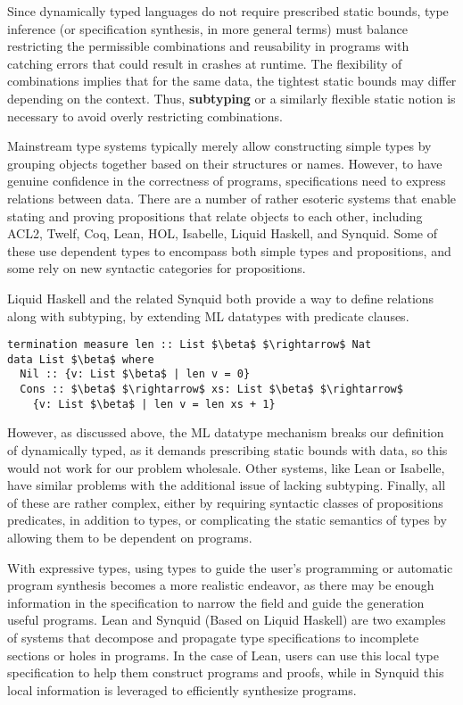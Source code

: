 \documentclass[sigplan,screen]{acmart}
\begin{document}
Since dynamically typed languages do not require prescribed static bounds, 
type inference (or specification synthesis, in more general terms) must balance 
restricting the permissible combinations and reusability in programs with 
catching errors that could result in crashes at runtime.
The flexibility of combinations implies that for the same data, 
the tightest static bounds may differ depending on the context.
Thus, \textbf{subtyping} or a similarly flexible 
static notion is necessary to avoid overly restricting combinations.

Mainstream type systems typically merely allow constructing simple types 
by grouping objects together based on their structures or names.
However, to have genuine confidence in the correctness of programs, specifications
need to express relations between data. There are a number of rather esoteric systems that
enable stating and proving propositions that relate objects to each other, 
including ACL2, Twelf, Coq, Lean, HOL, Isabelle, Liquid Haskell, and Synquid.  
Some of these use dependent types to encompass both simple types and propositions, 
and some rely on new syntactic categories for propositions. 

Liquid Haskell and the related Synquid both provide a way to define relations
along with subtyping, by extending ML datatypes with predicate clauses. 

\begin{lstlisting}[keywords={termination, measure, data, where}]
termination measure len :: List $\beta$ $\rightarrow$ Nat 
data List $\beta$ where
  Nil :: {v: List $\beta$ | len v = 0}
  Cons :: $\beta$ $\rightarrow$ xs: List $\beta$ $\rightarrow$ 
    {v: List $\beta$ | len v = len xs + 1}

\end{lstlisting}

However, as discussed above, the ML datatype mechanism breaks our definition of dynamically typed,
as it demands prescribing static bounds with data, so this would not work for our problem wholesale.
Other systems, like Lean or Isabelle, have similar problems with the additional issue of lacking subtyping.
Finally, all of these are rather complex, either by requiring syntactic classes of propositions predicates, 
in addition to types, or complicating the static semantics of types by allowing them 
to be dependent on programs.



With expressive types, using types to guide the user's programming or automatic program synthesis 
becomes a more realistic endeavor, as there may be enough information in the specification to narrow the field
and guide the generation useful programs. Lean and Synquid\cite{} (Based on Liquid Haskell) 
are two examples of systems that decompose and propagate type specifications 
to incomplete sections or holes in programs. 
In the case of Lean, users can use this local type specification to help them construct programs and proofs,
while in Synquid this local information is leveraged to efficiently synthesize programs. 
\end{document}
